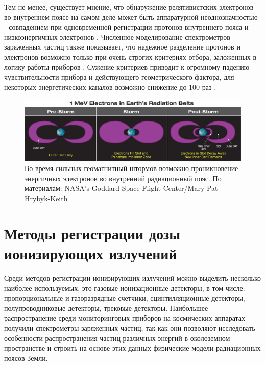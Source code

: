 Тем не менее, существует мнение, что обнаружение релятивистских  электронов во внутреннем поясе на самом деле может быть аппаратурной неоднозначностью - совпадением при одновременной регистрации  протонов внутреннего пояса и низкоэнергичных электронов \cite{Selesnick2015}. Численное моделирование спектрометров заряженных частиц также показывает, что надежное разделение протонов и электронов возможно только при очень строгих критериях отбора, заложенных в логику работы приборов \cite{zolotarev2017numerical51590279}. Сужение критериев  приводит к огромному падению чувствительности прибора и действующего геометрического фактора, для некоторых энергетических каналов возможно снижение до 100 раз \cite{zolotarev2017numerical51590279}.
 
\begin{figure}
	\centering
	\includegraphics[width=0.7\linewidth]{images/inner_electron_belt_illustration}
	\caption[Образование долгоживущего внутреннего электронного пояса]{ Во время сильных геомагнитный штормов возможно проникновение энергичных электронов во внутренний радиационный пояс. По материалам: NASA’s Goddard Space Flight Center/Mary Pat Hrybyk-Keith \cite{Johnson-Groh2017}}
	\label{fig:innerelectronbeltillustration}
\end{figure}

\section{Методы регистрации дозы ионизирующих излучений} \label{sect1_2}

Среди методов регистрации ионизирующих излучений можно выделить несколько наиболее используемых, это газовые ионизационные детекторы, в том числе:  пропорциональные и газоразрядные счетчики, сцинтилляционные детекторы, полупроводниковые детекторы, трековые детекторы. Наибольшее распространение среди мониторинговых приборов на космических аппаратах получили спектрометры заряженных частиц, так как они позволяют исследовать особенности распространения частиц различных энергий в околоземном пространстве и строить на основе этих данных физические модели радиационных поясов Земли.

